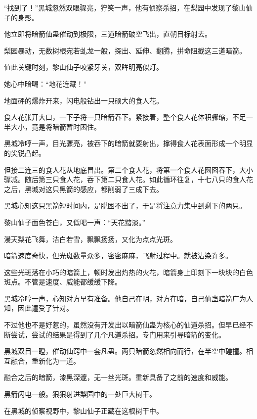 
\begin{this_body}

“找到了！”黑城忽然双眼骤亮，狞笑一声，他有侦察杀招，在梨园中发现了黎山仙子的身影。

他立即将暗箭仙蛊催动到极限，三道暗箭破空飞出，直朝目标射去。

梨园暴动，无数树根宛若虬龙一般，探出、延伸、翻腾，拼命阻截这三道暗箭。

值此关键时刻，黎山仙子咬紧牙关，双眸明亮似灯。

她心中暗喝：“地花连藏！”

地面砰的爆炸开来，闪电般钻出一只硕大的食人花。

食人花张开大口，一下子将一只暗箭吞下。紧接着，整个食人花体积骤缩，不足一半大小，竟是将暗箭暂时困住。

黑城冷哼一声，目光骤亮，被吞下的暗箭就要射出，撑得食人花表面形成一个明显的尖锐凸起。

但接二连三的食人花从地底冒出。第二个食人花，将第一个食人花囫囵吞下，大小骤减。随后第三只食人花，吞下第二只食人花。如此循环往复，十七八只的食人花之后，黑城对这只黑箭的感应，都削弱了三成下去。

黑城心知这只黑箭短时间内，是脱困不出了，于是将注意力集中到剩下的两只。

黎山仙子面色苍白，又低喝一声：“天花黯淡。”

漫天梨花飞舞，洁白若雪，飘飘扬扬，又化为点点光斑。

暗箭速度奇快，但光斑数量众多，密密麻麻，飞射过程中。就被沾染许多。

这些光斑落在小巧的暗箭上，顿时发出灼热的火花，暗箭身上印刻下一块块的白色斑点。不管是速度、威能都缓缓下降。

黑城冷哼一声，心知对方早有准备。他自己在明，对方在暗，自己仙蛊暗箭广为人知，因此遭受了针对。

不过他也不是好惹的，虽然没有开发出以暗箭仙蛊为核心的仙道杀招。但早已经不断尝试，尝试的结果是得到了几个凡道杀招。专门用来引导暗箭的变化。

黑城双目一瞪，催动仙窍中一套凡蛊。两只暗箭忽然相向而行，在半空中碰撞。相互融合，重新化为一道。

融合之后的暗箭，漆黑深邃，无一丝光斑。重新具备了之前的速度和威能。

黑箭闪电一般。狠狠射进梨园中的一处巨大树干。

在黑城的侦察视野中，黎山仙子正藏在这根树干中。


\end{this_body}

